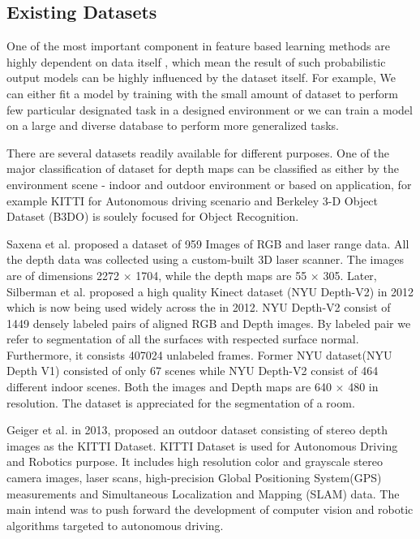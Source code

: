 \subsection{Existing Datasets}

One of the most important component in feature based learning methods are highly dependent on data itself \cite{friedman2001elements}, which mean the result of such probabilistic output models can be highly influenced by the dataset itself. For example, We can either fit a model by training with the small amount of dataset to perform few particular designated task in a designed environment or we can train a model on a large and diverse database to perform more generalized tasks.

There are several datasets readily available for different purposes. One of the major classification of dataset for depth maps can be classified as either by the environment scene - indoor and outdoor environment or based on application, for example KITTI for Autonomous driving \cite{Geiger2013IJRR} scenario and Berkeley 3-D Object Dataset (B3DO) \cite{Janoch:EECS-2012-85} is soulely focused for Object Recognition.

Saxena et al. \cite{saxena2006learning} proposed a dataset of 959 Images of RGB and laser range data. All the depth data was collected using a custom-built 3D laser scanner. The images are of dimensions 2272 $\times$ 1704, while the depth maps are 55 $\times$ 305. Later, Silberman et al. \cite{Silberman:ECCV12} proposed a high quality Kinect dataset (NYU Depth-V2) in 2012 which is now being used widely across the in 2012. NYU Depth-V2 \cite{Silberman:ECCV12} consist of 1449 densely labeled pairs of aligned RGB and Depth images. By labeled pair we refer to segmentation of all the surfaces with respected surface normal. Furthermore, it consists 407024 unlabeled frames. Former NYU dataset(NYU Depth V1) \cite{silberman11indoor} consisted of only 67 scenes while NYU Depth-V2 consist of 464 different indoor scenes. Both the images and Depth maps are 640 $\times$ 480 in resolution. The dataset is appreciated for the segmentation of a room.

Geiger et al. \cite{Geiger2013IJRR} in 2013, proposed an outdoor dataset consisting of stereo depth images as the KITTI Dataset. KITTI Dataset is used for Autonomous Driving and Robotics purpose. It includes high resolution color and grayscale stereo camera images, laser scans, high-precision Global Positioning System(GPS) measurements and Simultaneous Localization and Mapping (SLAM) data. The main intend was to push forward the development of computer vision and robotic algorithms targeted to autonomous driving.

